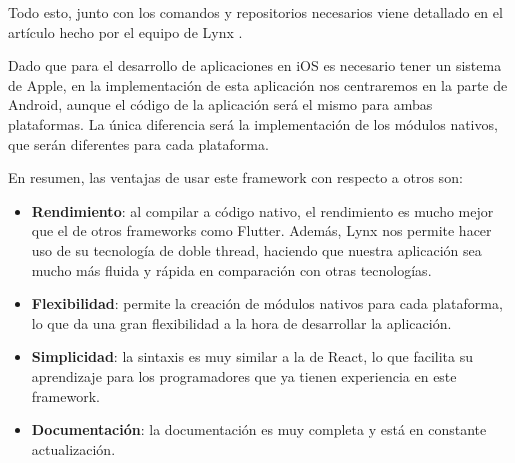 Todo esto, junto con los comandos y repositorios necesarios viene detallado en el artículo hecho por el equipo de Lynx \parencite{lynx-native-modules}.

Dado que para el desarrollo de aplicaciones en iOS es necesario tener un sistema de Apple, en la implementación de esta aplicación nos centraremos en la parte de Android, aunque el código de la aplicación será el mismo para ambas plataformas.
La única diferencia será la implementación de los módulos nativos, que serán diferentes para cada plataforma.

En resumen, las ventajas de usar este framework con respecto a otros son:
\begin{itemize}
    \item \textbf{Rendimiento}: al compilar a código nativo, el rendimiento es mucho mejor que el de otros frameworks como Flutter. Además, Lynx nos permite hacer uso de su tecnología de doble thread, haciendo que nuestra aplicación sea mucho más fluida y rápida en comparación con otras tecnologías.
    \item \textbf{Flexibilidad}: permite la creación de módulos nativos para cada plataforma, lo que da una gran flexibilidad a la hora de desarrollar la aplicación.
    \item \textbf{Simplicidad}: la sintaxis es muy similar a la de React, lo que facilita su aprendizaje para los programadores que ya tienen experiencia en este framework.
    \item \textbf{Documentación}: la documentación es muy completa y está en constante actualización.
\end{itemize}

